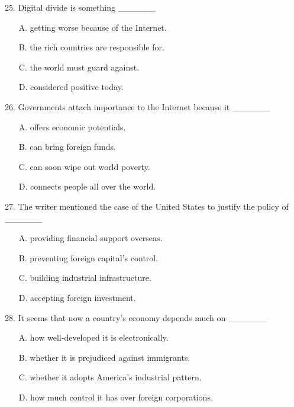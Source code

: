 \documentclass[UTF8,11pt]{ctexart}
\begin{document}
25. Digital divide is something \_\_\_\_\_\_


\begin{itemize}[leftmargin=2em,itemsep=.2em,topsep=.4em]\item[A.] getting worse because of the Internet.
\item[B.] the rich countries are responsible for.
\item[C.] the world must guard against.
\item[D.] considered positive today.
\end{itemize}

26. Governments attach importance to the Internet because it \_\_\_\_\_\_


\begin{itemize}[leftmargin=2em,itemsep=.2em,topsep=.4em]\item[A.] offers economic potentials.
\item[B.] can bring foreign funds.
\item[C.] can soon wipe out world poverty.
\item[D.] connects people all over the world.
\end{itemize}

27. The writer mentioned the case of the United States to justify the policy of \_\_\_\_\_\_


\begin{itemize}[leftmargin=2em,itemsep=.2em,topsep=.4em]\item[A.] providing financial support overseas.
\item[B.] preventing foreign capital’s control.
\item[C.] building industrial infrastructure.
\item[D.] accepting foreign investment.
\end{itemize}

28. It seems that now a country’s economy depends much on \_\_\_\_\_\_


\begin{itemize}[leftmargin=2em,itemsep=.2em,topsep=.4em]\item[A.] how well-developed it is electronically.
\item[B.] whether it is prejudiced against immigrants.
\item[C.] whether it adopts America’s industrial pattern.
\item[D.] how much control it has over foreign corporations.
\end{itemize}
\end{document}
